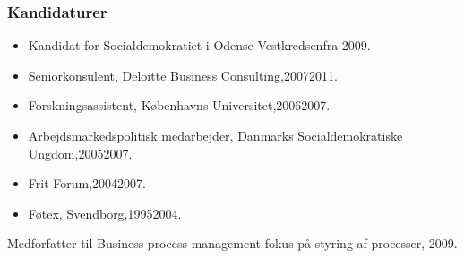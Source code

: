 \documentclass[11pt, a4paper]{awesome-cv}
\begin{document}
\begin{cvletter}
\subsubsection*{Kandidaturer}
\begin{itemize}
\item Kandidat for Socialdemokratiet i Odense Vestkredsenfra 2009.
\end{itemize}
\begin{itemize}
\item Seniorkonsulent, Deloitte Business Consulting,20072011.
\item Forskningsassistent, Københavns Universitet,20062007.
\item Arbejdsmarkedspolitisk medarbejder, Danmarks Socialdemokratiske Ungdom,20052007.
\item Frit Forum,20042007.
\item Føtex, Svendborg,19952004.
\end{itemize}
Medforfatter til Business process management  fokus på styring af processer, 2009.

\end{cvletter}
\end{document}
